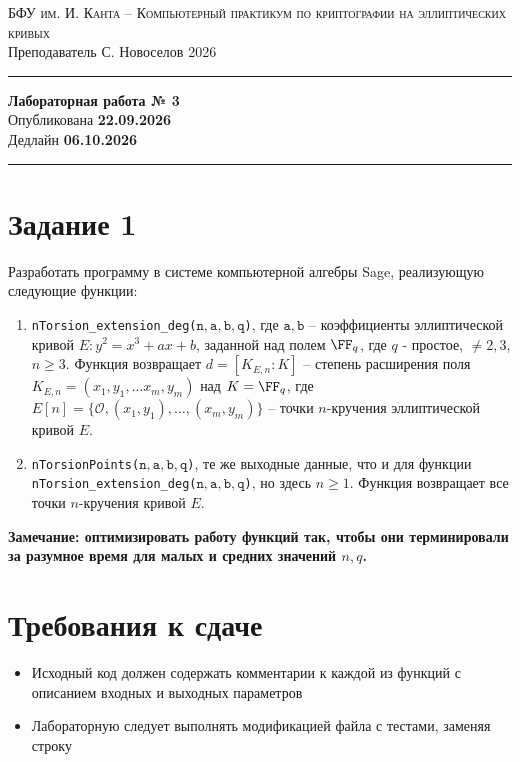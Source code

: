 \documentclass[11pt]{exam}
\theoremstyle{definition}
\begin{document}
	
	{\noindent
		\textsc{БФУ им. И. Канта -- Компьютерный практикум по криптографии на эллиптических кривых }\\[5pt]
		Преподаватель {С. Новоселов}   \hfill{2026\\}
	\hrule
	\begin{center}
		{\LARGE\textbf{
				Лабораторная работа № 3 \\[5pt]
		}} 
			Опубликована \textbf{22.09.2026} \\[5pt] 
			Дедлайн \textbf{06.10.2026}
		
	\end{center}
	\hrule \vspace{5mm}
	
	\section*{Задание 1}
	
	\thispagestyle{empty}
	
	Разработать программу в системе компьютерной алгебры Sage, реализующую следующие функции:
	
	\begin{enumerate}
		\item \texttt{nTorsion\_extension\_deg($\mathtt{n, a, b, q}$)}, где $\mathtt{a, b}$ -- коэффициенты эллиптической кривой $E: y^2 = x^3 +ax+b$, заданной над полем $\FF_q$, где $q$ - простое, $\neq 2,3$, $n \geq 3$. Функция возвращает $d = [K_{E,n}: K]$ -- степень расширения поля $K_{E,n} = (x_1, y_1, \ldots x_m, y_m)$ над $K = \FF_q$, где $E[n] = \{ \mathcal{O}, (x_1, y_1), \ldots, (x_m, y_m)\}$ -- точки $n$-кручения эллиптической кривой $E$.
		
		\item \texttt{nTorsionPoints($\mathtt{n, a, b, q}$)}, те же выходные данные, что и для функции  \texttt{nTorsion\_extension\_deg($\mathtt{n, a, b, q}$)}, но здесь $n \geq 1$. Функция возвращает все точки $n$-кручения кривой $E$.
	\end{enumerate}

\Large {
		\textbf{Замечание: оптимизировать работу функций так, чтобы они терминировали за разумное время для малых и средних значений $n, q$.}
		
}
\normalsize
\section*{Требования к сдаче}
\begin{itemize}
    \item Исходный код должен содержать комментарии к каждой из функций с описанием входных и выходных параметров
    \item Лабораторную следует выполнять модификацией файла с тестами, заменяя строку
    

\end{itemize}}
\end{document}
